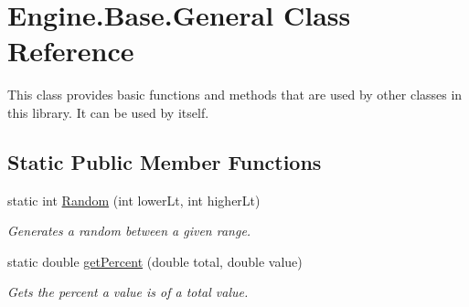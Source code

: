 \hypertarget{class_engine_1_1_base_1_1_general}{}\section{Engine.\+Base.\+General Class Reference}
\label{class_engine_1_1_base_1_1_general}


This class provides basic functions and methods that are used by other classes in this library. It can be used by itself.  


\subsection*{Static Public Member Functions}
\begin{DoxyCompactItemize}
\item 
static int \mbox{\hyperlink{class_engine_1_1_base_1_1_general_a85c9268f77d1ec0d86501fbb7ee2b39a}{Random}} (int lower\+Lt, int higher\+Lt)
\begin{DoxyCompactList}\small\item\em Generates a random between a given range. \end{DoxyCompactList}\item 
static double \mbox{\hyperlink{class_engine_1_1_base_1_1_general_a2122b1dc3c6875bf580fe669a0f86d84}{get\+Percent}} (double total, double value)
\begin{DoxyCompactList}\small\item\em Gets the percent a value is of a total value. \end{DoxyCompactList}\end{DoxyCompactItemize}
